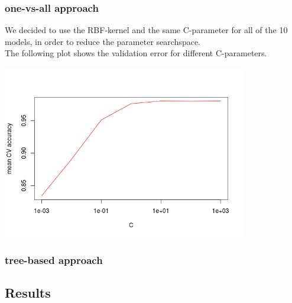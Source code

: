 \subsubsection{one-vs-all approach}

We decided to use the RBF-kernel and the same C-parameter for all of the 10 models,
in order to reduce the parameter searchspace.\\
The following plot shows the validation error for different C-parameters.

\includegraphics[width=0.8\textwidth]{../plots/one_vs_all_zip}

\subsubsection{tree-based approach}


\subsection{Results}